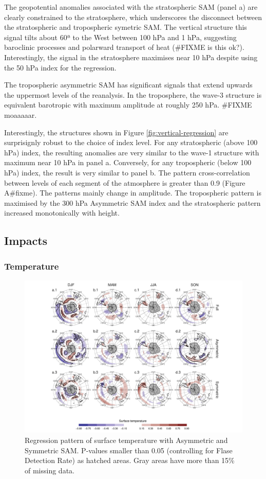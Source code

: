 \documentclass[twocol]{ametsocV5}
\begin{document}
The geopotential anomalies associated with the stratospheric SAM (panel
a) are clearly constrained to the stratosphere, which underscores the
disconnect between the stratospheric and tropospheric symetric SAM. The
vertical structure this signal tilts about 60ª to the West between 100
hPa and 1 hPa, suggesting baroclinic processes and polarward transport
of heat (\#FIXME is this ok?). Interestingly, the signal in the
stratosphere maximises near 10 hPa despite using the 50 hPa index for
the regression.

The tropospheric asymmetric SAM has significant signals that extend
upwards the uppermost levels of the reanalysis. In the troposphere, the
wave-3 structure is equivalent barotropic with maximum amplitude at
roughly 250 hPa. \#FIXME moaaaaar.

Interestingly, the structures shown in Figure
\ref{fig:vertical-regression} are surprisignly robust to the choice of
index level. For any stratospheric (above 100 hPa) index, the resulting
anomalies are very similar to the wave-1 structure with maximum near 10
hPa in panel a. Conversely, for any tropospheric (below 100 hPa) index,
the result is very similar to panel b. The pattern cross-correlation
between levels of each segment of the atmosphere is greater than 0.9
(Figure A\#fixme). The patterns mainly change in amplitude. The
tropospheric pattern is maximised by the 300 hPa Asymmetric SAM index
and the stratospheric pattern increased monotonically with height.

\subsection{Impacts}

\subsubsection{Temperature}

\begin{figure}
\includegraphics{regr-air-season-1} \caption[Regression pattern of surface temperature with Asymmetric and Symmetric SAM]{Regression pattern of surface temperature with Asymmetric and Symmetric SAM. P-values smaller than 0.05 (controlling for Flase Detection Rate) as hatched areas. Gray areas have more than 15\% of missing data.}\label{fig:regr-air-season}
\end{figure}
\end{document}
